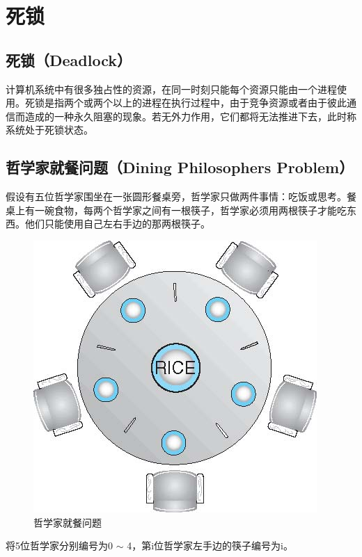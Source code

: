 \section{死锁}

\subsection{死锁（Deadlock）}

计算机系统中有很多独占性的资源，在同一时刻只能每个资源只能由一个进程使用。死锁是指两个或两个以上的进程在执行过程中，由于竞争资源或者由于彼此通信而造成的一种永久阻塞的现象。若无外力作用，它们都将无法推进下去，此时称系统处于死锁状态。\\

\subsection{哲学家就餐问题（Dining Philosophers Problem）}

假设有五位哲学家围坐在一张圆形餐桌旁，哲学家只做两件事情：吃饭或思考。餐桌上有一碗食物，每两个哲学家之间有一根筷子，哲学家必须用两根筷子才能吃东西。他们只能使用自己左右手边的那两根筷子。

\begin{figure}[H]
    \centering
    \includegraphics[]{img/Chapter2/2-8/1.png}
    \caption{哲学家就餐问题}
\end{figure}

将5位哲学家分别编号为0 $\sim $ 4，第i位哲学家左手边的筷子编号为i。

\vspace{-0.5cm}

